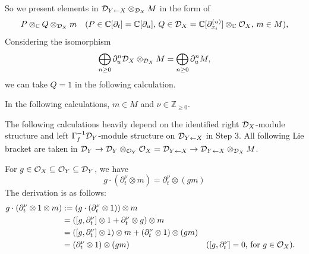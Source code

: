 \begin{example}
\begin{enumerate}
              So we present elements in $\mathcal{D}_{Y \leftarrow X} \otimes_{\mathcal{D}_X} M$ in the form of
              \[
                  P\otimes_{\mathbb{C}} Q \otimes_{\mathcal{D}_X} m\quad (P\in\mathbb{C}[\partial_t]=\mathbb{C}[\partial_u],\, Q\in\mathcal{D}_X = \mathbb{C}[\partial^{(u)}_{x_i}]\otimes_{\mathbb{C}}\mathcal{O}_X,\, m\in M),
              \]
              Considering the isomorphism
              \[
                  \bigoplus_{n \ge 0} \partial_u^n \mathcal{D}_X \otimes_{\mathcal{D}_X} M = \bigoplus_{n \ge 0} \partial_u^n M,
              \]
              we can take $Q=1$ in the following calculation.

              In the following calculations, $m\in M$ and $\nu \in \mathbb{Z}_{\ge 0}$.

              The following calculations heavily depend on the identified right $\mathcal{D}_X$-module structure and left $\Gamma_f^{-1}\mathcal{D}_Y$-module structure on $\mathcal{D}_{Y\leftarrow X}$ in Step 3.
              All following Lie bracket are taken in $\mathcal{D}_Y\to \mathcal{D}_Y\otimes_{\mathcal{O}_Y}\mathcal{O}_X = \mathcal{D}_{Y\leftarrow X} \to \mathcal{D}_{Y\leftarrow X}\otimes_{\mathcal{D}_X} M$.

              For $g\in \mathcal{O}_X\subseteq\mathcal{O}_Y\subseteq\mathcal{D}_Y$, we have
              \[
                  g\cdot(\partial_t^\nu \otimes m) = \partial_t^\nu\otimes (gm)
              \]
              The derivation is as follows:
              \begin{align*}
                  g\cdot(\partial_t^\nu\otimes 1 \otimes m) & := (g\cdot (\partial_t^\nu\otimes 1))\otimes m                                                                                        \\
                                                            & = ([g,\partial_t^\nu]\otimes 1 + \partial_t^\nu\otimes g)\otimes m                                                                    \\
                                                            & = ([g,\partial_t^\nu]\otimes 1)\otimes m + (\partial_t^\nu\otimes 1)\otimes (gm)                                                      \\
                                                            & = (\partial_t^\nu\otimes 1)\otimes (gm)                                          &  & \text{($[g,\partial_t^\nu]=0$, for $g\in\mathcal{O}_X$)}.
              \end{align*}


\end{enumerate}
\end{example}
